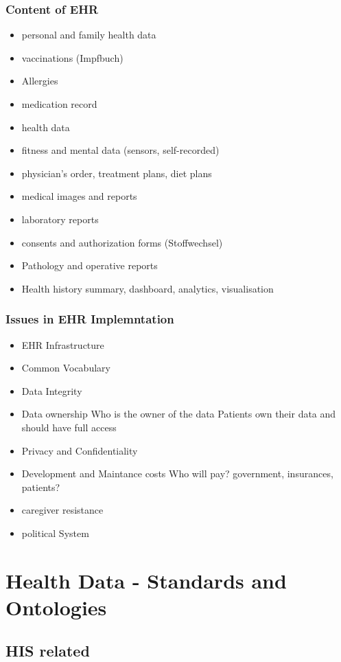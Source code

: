 \documentclass{report}
\theoremstyle{definition}
\theoremstyle{example}
\begin{document}
\subsection{Content of EHR}
\begin{itemize}
   \item personal and family health data
   \item vaccinations (Impfbuch)
   \item Allergies
   \item medication record
   \item health data
   \item fitness and mental data (sensors, self-recorded)
   \item physician's order, treatment plans, diet plans
   \item medical images and reports
   \item laboratory reports
   \item consents and authorization forms (Stoffwechsel)
   \item Pathology and operative reports
   \item Health history summary, dashboard, analytics, visualisation
\end{itemize}
\subsection{Issues in EHR Implemntation}
\begin{itemize}
   \item EHR Infrastructure
   \item Common Vocabulary
   \item Data Integrity
   \item Data ownership
   \subitem Who is the owner of the data
   \subitem Patients own their data and should have full access 
   \item Privacy and Confidentiality
   \item Development and Maintance costs
   \subitem Who will pay? government, insurances, patients?
   \item caregiver resistance
   \item political System
\end{itemize}

\chapter{Health Data - Standards and Ontologies}

\section{HIS related}
\end{document}

